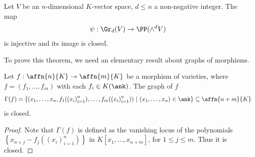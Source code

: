\begin{theorem}\label{thm:plucker}
    Let $V$ be an $n$-dimensional $K$-vector space, $d \leq n$ a non-negative integer. The map
    \[ \psi: \Gr_d(V) \rightarrow \PP(\wedge^d V) \]
    is injective and its image is closed.
\end{theorem}
To prove this theorem, we need an elementary result about graphs of morphisms.
\begin{lemma}
    Let $f: \affn{n}{K} \to \affn{m}{K}$ be a morphism of varieties, where $f = (f_1, \ldots, f_m)$ with each $f_i\in K(\ank)$. The graph of $f$
    \[\Gamma(f) = \left\{(x_1, \ldots, x_n, f_1({(x_i)}_{i = 1}^n), \ldots, f_m({(x_i)}_{i = 1}^n)) ~\middle|~ (x_1, \ldots, x_n) \in \ank\right\} \subseteq \affn{n+m}{K}\]
    is closed.
\end{lemma}
\begin{proof}
    Note that $\Gamma(f)$ is defined as the vanishing locus of the polynomials $\left\{x_{n + j} - f_j({(x_i)}_{i = 1}^n)\right\}$ in $K[x_1, \ldots, x_{n+m}]$, for $1 \leq j \leq m$. Thus it is closed.
\end{proof}
